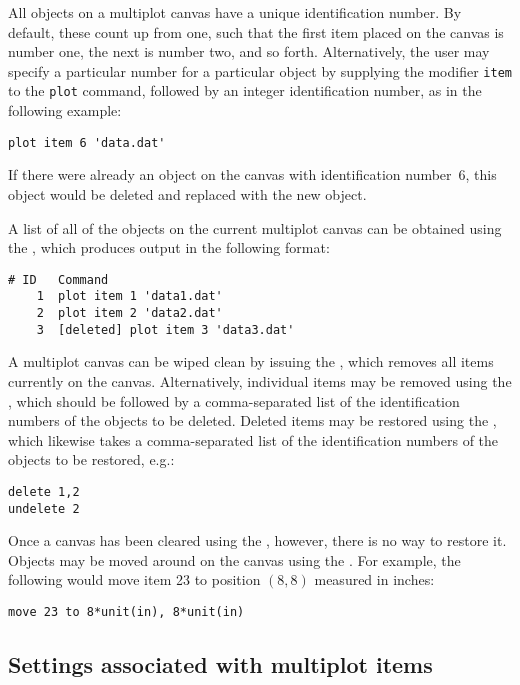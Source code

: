 All objects on a multiplot canvas have a unique identification number.  By
default, these count up from one, such that the first item placed on the canvas
is number one, the next is number two, and so forth. Alternatively, the user
may specify a particular number for a particular object by supplying the
modifier {\tt item} to the {\tt plot} command, followed by an integer
identification number, as in the following example:
\begin{verbatim}
plot item 6 'data.dat'
\end{verbatim}
If there were already an object on the canvas with identification number~6,
this object would be deleted and replaced with the new object.

A list of all of the objects on the current multiplot canvas can be obtained
using the , which produces output in the following format:
\begin{verbatim}
# ID   Command
    1  plot item 1 'data1.dat'
    2  plot item 2 'data2.dat'
    3  [deleted] plot item 3 'data3.dat'
\end{verbatim}

A multiplot canvas can be wiped clean by issuing the , which
removes all items currently on the canvas. Alternatively, individual items may
be removed using the , which should be followed by a
comma-separated list of the identification numbers of the objects to be
deleted.  Deleted items may be restored using the , which
likewise takes a comma-separated list of the identification numbers of the
objects to be restored, e.g.:
\begin{verbatim}
delete 1,2
undelete 2
\end{verbatim}
Once a canvas has been cleared using the , however, there is no
way to restore it.  Objects may be moved around on the canvas using the
. For example, the following would move item 23 to position
$(8,8)$ measured in inches:
\begin{verbatim}
move 23 to 8*unit(in), 8*unit(in)
\end{verbatim}

\subsection{Settings associated with multiplot items}

